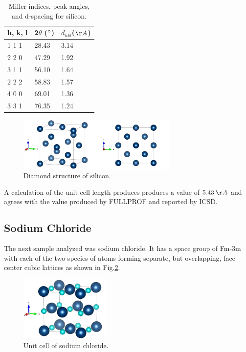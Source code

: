 \documentclass[12pt]{article}
\begin{document}
\begin{table}[h!]\centering
\begin{tabular}{ |p{3cm}|p{3cm}|p{3cm}|}
 \hline
  h, k, l & 2$\theta$ ($\degree$)& $d_{hkl}$($\AA$)\\
 \hline
 1 1 1 &  28.43 & 3.14\\
 \hline
 2 2 0 &  47.29 & 1.92\\
 \hline
 3 1 1 &  56.10 & 1.64\\
 \hline
 2 2 2 &  58.83 & 1.57\\
 \hline
 4 0 0 &  69.01 & 1.36\\
 \hline
 3 3 1 &  76.35 & 1.24\\
 \hline
\end{tabular}
\def\sym#1{\ifmmode^{#1}\else\(^{#1}\)\fi}
\caption{Miller indices, peak angles, and d-spacing for silicon.}\label{tab:Si_miller}
\end{table}
 

\begin{figure}[h!]\centering
 \quad \includegraphics[width=0.7\textwidth]{Si_structure}
\caption{Diamond structure of silicon.}
\label{fig:Si_structure}
\end{figure}

\noindent
A calculation of the unit cell length produces produces a value of $5.43 \: \AA$ and agrees with the value produced by FULLPROF and reported by ICSD.

\newpage
\subsection{Sodium Chloride}
The next sample analyzed was sodium chloride. It has a space group of Fm-3m with each of the two species of atoms forming separate, but overlapping, face center cubic lattices as shown in Fig.\ref{fig:NaCl_struct}. 
\begin{figure}[h!]\centering
 \quad \includegraphics[width=0.4\textwidth]{Nacl_struct}
\caption{Unit cell of sodium chloride.}
\label{fig:NaCl_struct}
\end{figure}
\end{document}

